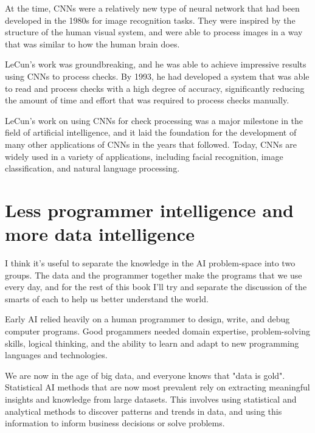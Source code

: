 At the time, CNNs were a relatively new type of neural network that had been developed in the 1980s for image recognition tasks. They were inspired by the structure of the human visual system, and were able to process images in a way that was similar to how the human brain does.

LeCun's work was groundbreaking, and he was able to achieve impressive results using CNNs to process checks. By 1993, he had developed a system that was able to read and process checks with a high degree of accuracy, significantly reducing the amount of time and effort that was required to process checks manually.

LeCun's work on using CNNs for check processing was a major milestone in the field of artificial intelligence, and it laid the foundation for the development of many other applications of CNNs in the years that followed. Today, CNNs are widely used in a variety of applications, including facial recognition, image classification, and natural language processing. 

\section{Less programmer intelligence and more data intelligence}

I think it's useful to separate the knowledge in the AI problem-space into two groups. The data and the programmer together make the programs that we use every day, and for the rest of this book I'll try and separate the discussion of the smarts of each to help us better understand the world. 

Early AI relied heavily on a human programmer to design, write, and debug computer programs. Good progammers needed domain expertise, problem-solving skills, logical thinking, and the ability to learn and adapt to new programming languages and technologies.

We are now in the age of big data, and everyone knows that "data is gold". Statistical AI methods that are now most prevalent rely on extracting meaningful insights and knowledge from large datasets. This involves using statistical and analytical methods to discover patterns and trends in data, and using this information to inform business decisions or solve problems. 

